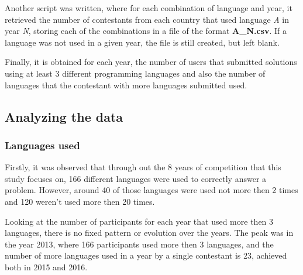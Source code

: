 \documentclass{article}
\begin{document}
\begin{multicols*}{2}
Another script was written, where for each combination of language and year, it retrieved the number of contestants from each country that used language \textit{A} in year \textit{N}, storing each of the combinations in a file of the format \textbf{A\_N.csv}. If a language was not used in a given year, the file is still created, but left blank.

Finally, it is obtained for each year, the number of users that submitted solutions using at least 3 different programming languages and also the number of languages that the contestant with more languages submitted used.

\subsection{Analyzing the data}

\subsubsection{Languages used}

Firstly, it was observed that through out the 8 years of competition that this study focuses on, 166 different languages were used to correctly answer a problem. However, around 40 of those languages were used not more then 2 times and 120 weren't used more then 20 times.

Looking at the number of participants for each year that used more then 3 languages, there is no fixed pattern or evolution over the years. The peak was in the year 2013, where 166 participants used more then 3 languages, and the number of more languages used in a year by a single contestant is 23, achieved both in 2015 and 2016.




\end{multicols*}
\end{document}
